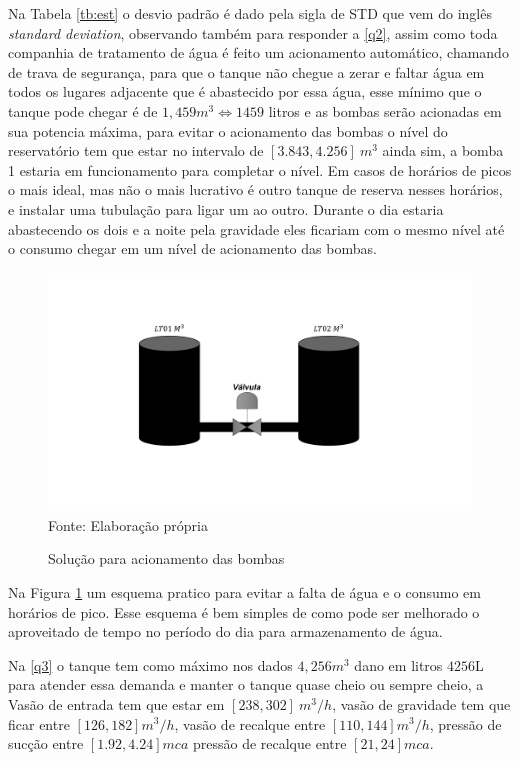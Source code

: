 Na Tabela \ref{tb:est} o desvio padrão é dado pela sigla de STD que vem do inglês \textit{standard deviation}, observando também para responder a \ref{q2}, assim como toda companhia de tratamento de água é feito um acionamento automático, chamando de trava de segurança, para que o tanque não chegue a zerar e faltar água em todos os lugares adjacente que é abastecido por essa água, esse mínimo que o tanque pode chegar é de $1,459 m^3\Longleftrightarrow 1459 $ litros e as bombas serão acionadas em sua potencia máxima, para evitar o acionamento das bombas o nível do reservatório tem que estar no intervalo de $[3.843,4.256]\ m^3$ ainda sim, a bomba 1 estaria em funcionamento para completar o nível. Em casos de horários de picos o mais ideal, mas não o mais lucrativo é outro tanque de reserva nesses horários, e instalar uma tubulação para ligar um ao outro. Durante o dia estaria abastecendo os dois e a noite pela gravidade eles ficariam com o mesmo nível até o consumo chegar em um nível de acionamento das bombas.  

\begin{figure}[H]
	\centering
	\caption{Solução para acionamento das bombas}
	\label{fig:esquema}
	\includegraphics[width=1\linewidth]{Resultados/Figuras/esquema}
	Fonte: Elaboração própria 
\end{figure}

Na Figura \ref{fig:esquema} um esquema pratico para evitar a falta de água e o consumo em horários de pico. Esse esquema é bem simples de como pode ser melhorado o aproveitado de tempo no período do dia para armazenamento de água.

Na \ref{q3} o tanque tem como máximo nos dados $4,256 m^3$ dano em litros $4256$L para atender essa demanda e manter o tanque quase cheio ou sempre cheio, a Vasão de entrada tem que estar em $[238,302] \ m^3/h$, vasão de gravidade tem que ficar entre $[126,182] m^3/h$, vasão de recalque entre $[110,144] m^3/h$, pressão de sucção entre $[1.92,4.24] mca$ pressão de recalque entre $[21,24] mca$.

